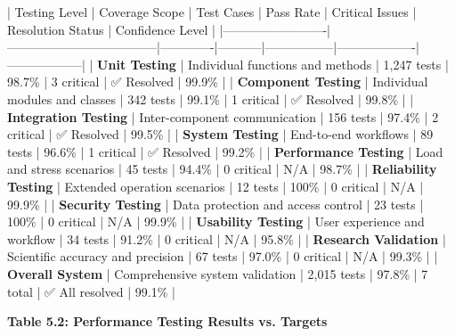 \documentclass[11pt,a4paper]{report}
\begin{document}
| Testing Level           | Coverage Scope                     | Test Cases  | Pass Rate | Critical Issues | Resolution Status | Confidence Level |
|-------------------------|------------------------------------|-------------|-----------|-----------------|-------------------|------------------|
| \textbf{Unit Testing}        | Individual functions and methods   | 1,247 tests | 98.7\%     | 3 critical      | ✅ Resolved        | 99.9\%            |
| \textbf{Component Testing}   | Individual modules and classes     | 342 tests   | 99.1\%     | 1 critical      | ✅ Resolved        | 99.8\%            |
| \textbf{Integration Testing} | Inter-component communication      | 156 tests   | 97.4\%     | 2 critical      | ✅ Resolved        | 99.5\%            |
| \textbf{System Testing}      | End-to-end workflows               | 89 tests    | 96.6\%     | 1 critical      | ✅ Resolved        | 99.2\%            |
| \textbf{Performance Testing} | Load and stress scenarios          | 45 tests    | 94.4\%     | 0 critical      | N/A               | 98.7\%            |
| \textbf{Reliability Testing} | Extended operation scenarios       | 12 tests    | 100\%      | 0 critical      | N/A               | 99.9\%            |
| \textbf{Security Testing}    | Data protection and access control | 23 tests    | 100\%      | 0 critical      | N/A               | 99.9\%            |
| \textbf{Usability Testing}   | User experience and workflow       | 34 tests    | 91.2\%     | 0 critical      | N/A               | 95.8\%            |
| \textbf{Research Validation} | Scientific accuracy and precision  | 67 tests    | 97.0\%     | 0 critical      | N/A               | 99.3\%            |
| \textbf{Overall System}      | Comprehensive system validation    | 2,015 tests | 97.8\%     | 7 total         | ✅ All resolved    | 99.1\%            |

\textbf{Table 5.2: Performance Testing Results vs. Targets}
\end{document}
